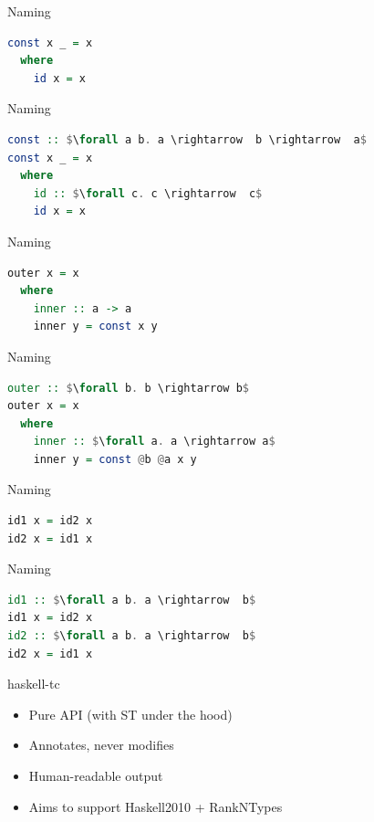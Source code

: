 \documentclass[pdf]{beamer}
\begin{document}
\begin{frame}[fragile]{Naming}
\begin{lstlisting}[language=Haskell]
const x _ = x
  where
    id x = x
\end{lstlisting}
\end{frame}

\begin{frame}[fragile]{Naming}
\begin{lstlisting}[language=Haskell,mathescape=true]
const :: $\forall a b. a \rightarrow  b \rightarrow  a$
const x _ = x
  where
    id :: $\forall c. c \rightarrow  c$
    id x = x
\end{lstlisting}
\end{frame}




\begin{frame}[fragile]{Naming}
\begin{lstlisting}[language=Haskell,mathescape=true]
outer x = x
  where
    inner :: a -> a
    inner y = const x y
\end{lstlisting}
\end{frame}

\begin{frame}[fragile]{Naming}
\begin{lstlisting}[language=Haskell,mathescape=true]
outer :: $\forall b. b \rightarrow b$
outer x = x
  where
    inner :: $\forall a. a \rightarrow a$
    inner y = const @b @a x y
\end{lstlisting}
\end{frame}





\begin{frame}[fragile]{Naming}
\begin{lstlisting}[language=Haskell,mathescape=true]
id1 x = id2 x
id2 x = id1 x
\end{lstlisting}
\end{frame}

\begin{frame}[fragile]{Naming}
\begin{lstlisting}[language=Haskell,mathescape=true]
id1 :: $\forall a b. a \rightarrow  b$
id1 x = id2 x
id2 :: $\forall a b. a \rightarrow  b$
id2 x = id1 x
\end{lstlisting}
\end{frame}

\begin{frame}
  \Large{haskell-tc}
  \begin{itemize}
    \item Pure API (with ST under the hood)
    \item Annotates, never modifies
    \item Human-readable output
    \item Aims to support Haskell2010 + RankNTypes
  \end{itemize}
\end{frame}
\end{document}

